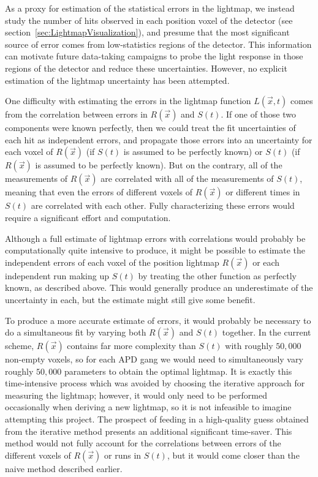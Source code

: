 As a proxy for estimation of the statistical errors in the lightmap, we instead study the number of hits observed in each position voxel of the detector (see section~\ref{sec:LightmapVisualization}), and presume that the most significant source of error comes from low-statistics regions of the detector.  This information can motivate future data-taking campaigns to probe the light response in those regions of the detector and reduce these uncertainties.  However, no explicit estimation of the lightmap uncertainty has been attempted.

One difficulty with estimating the errors in the lightmap function $L(\vec{x},t)$ comes from the correlation between errors in $R(\vec{x})$ and $S(t)$.  If one of those two components were known perfectly, then we could treat the fit uncertainties of each hit as independent errors, and propagate those errors into an uncertainty for each voxel of $R(\vec{x})$ (if $S(t)$ is assumed to be perfectly known) or $S(t)$ (if $R(\vec{x})$ is assumed to be perfectly known).  But on the contrary, all of the measurements of $R(\vec{x})$ are correlated with all of the measurements of $S(t)$, meaning that even the errors of different voxels of $R(\vec{x})$ or different times in $S(t)$ are correlated with each other.  Fully characterizing these errors would require a significant effort and computation.

Although a full estimate of lightmap errors with correlations would probably be computationally quite intensive to produce, it might be possible to estimate the independent errors of each voxel of the position lightmap $R(\vec{x})$ or each independent run making up $S(t)$ by treating the other function as perfectly known, as described above.  This would generally produce an underestimate of the uncertainty in each, but the estimate might still give some benefit.

To produce a more accurate estimate of errors, it would probably be necessary to do a simultaneous fit by varying both $R(\vec{x})$ and $S(t)$ together.  In the current scheme, $R(\vec{x})$ contains far more complexity than $S(t)$ with roughly $50,000$ non-empty voxels, so for each APD gang we would need to simultaneously vary roughly $50,000$ parameters to obtain the optimal lightmap.  It is exactly this time-intensive process which was avoided by choosing the iterative approach for measuring the lightmap; however, it would only need to be performed occasionally when deriving a new lightmap, so it is not infeasible to imagine attempting this project.  The prospect of feeding in a high-quality guess obtained from the iterative method presents an additional significant time-saver.  This method would not fully account for the correlations between errors of the different voxels of $R(\vec{x})$ or runs in $S(t)$, but it would come closer than the naive method described earlier.

